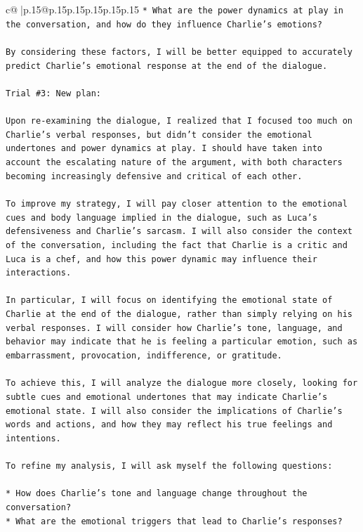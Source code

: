 \documentclass{article}
\begin{document}
{\begin{supertabular}{c@{$\;$}|p{.15\linewidth}@{}p{.15\linewidth}p{.15\linewidth}p{.15\linewidth}p{.15\linewidth}p{.15\linewidth}}
{{{\texttt{* What are the power dynamics at play in the conversation, and how do they influence Charlie's emotions?} \\
\\ 
\texttt{By considering these factors, I will be better equipped to accurately predict Charlie's emotional response at the end of the dialogue.} \\
\\ 
\texttt{Trial \#3: New plan: } \\
\\ 
\texttt{Upon re{-}examining the dialogue, I realized that I focused too much on Charlie's verbal responses, but didn't consider the emotional undertones and power dynamics at play. I should have taken into account the escalating nature of the argument, with both characters becoming increasingly defensive and critical of each other.} \\
\\ 
\texttt{To improve my strategy, I will pay closer attention to the emotional cues and body language implied in the dialogue, such as Luca's defensiveness and Charlie's sarcasm. I will also consider the context of the conversation, including the fact that Charlie is a critic and Luca is a chef, and how this power dynamic may influence their interactions.} \\
\\ 
\texttt{In particular, I will focus on identifying the emotional state of Charlie at the end of the dialogue, rather than simply relying on his verbal responses. I will consider how Charlie's tone, language, and behavior may indicate that he is feeling a particular emotion, such as embarrassment, provocation, indifference, or gratitude.} \\
\\ 
\texttt{To achieve this, I will analyze the dialogue more closely, looking for subtle cues and emotional undertones that may indicate Charlie's emotional state. I will also consider the implications of Charlie's words and actions, and how they may reflect his true feelings and intentions.} \\
\\ 
\texttt{To refine my analysis, I will ask myself the following questions:} \\
\\ 
\texttt{* How does Charlie's tone and language change throughout the conversation?} \\
\texttt{* What are the emotional triggers that lead to Charlie's responses?} \\
}}}
\end{supertabular}}
\end{document}
